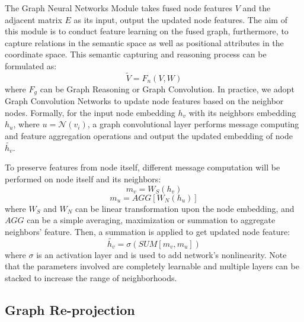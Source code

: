 ﻿\documentclass[journal]{IEEEtran}
\begin{document}
    The Graph Neural Networks Module takes fused node features $V$ and the adjacent matrix $E$ as its input, output the updated node features. The aim of this module is to conduct feature learning on the fused graph, furthermore, to capture relations in the semantic space as well as positional attributes in the coordinate space. This semantic capturing and reasoning process can be formulated as:
    \begin{equation}
        \tilde{V} = F_n(V, W)
    \end{equation}
    where  $F_g$ can be Graph Reasoning or Graph Convolution. In practice, we adopt Graph Convolution Networks \cite{kipf2016GCN} to update node features based on the neighbor nodes. Formally, for the input node embedding $h_v$ with its neighbors embedding $h_u$, where $u={\mathcal{N}(v_i)}$, a graph convolutional layer performs message computing and feature aggregation operations and output the updated embedding of node $\tilde{h_{v}}$.  

 
    To preserve features from node itself, different message computation will be performed on node itself and its neighbors:
    \begin{equation}
        m_{v} = W_{S}(h_v)
    \end{equation}
    \begin{equation}
        m_{u} = AGG[W_{N}(h_u)]
    \end{equation}
    where $W_S$ and $W_N$ can be linear transformation upon the node embedding, and $AGG$ can be a simple averaging, maximization or summation to aggregate neighbors' feature. Then, a summation is applied to get updated node feature:
    \begin{equation}
        \tilde{h_{v}} = \sigma(SUM[m_{v}, m_{u}])
    \end{equation}
    where $\sigma$ is an activation layer and is used to add network's nonlinearity. Note that the parameters involved are completely learnable and multiple layers can be stacked to increase the range of neighborhoods.
    \\   

  
\subsection{Graph Re-projection}  
 
\end{document}

